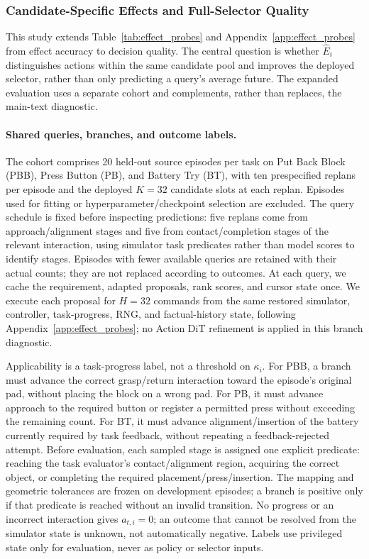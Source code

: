 \begingroup
\raggedbottom

\subsubsection{Candidate-Specific Effects and Full-Selector Quality}
\label{app:rebuttal_selector}

This study extends Table~\ref{tab:effect_probes} and Appendix~\ref{app:effect_probes} from effect accuracy to decision quality.
The central question is whether $\widehat E_i$ distinguishes actions within the same candidate pool and improves the deployed selector, rather than only predicting a query's average future.
The expanded evaluation uses a separate cohort and complements, rather than replaces, the main-text diagnostic.

\paragraph{Shared queries, branches, and outcome labels.}
The cohort comprises 20 held-out source episodes per task on Put Back Block (PBB), Press Button (PB), and Battery Try (BT), with ten prespecified replans per episode and the deployed $K=32$ candidate slots at each replan.
Episodes used for fitting or hyperparameter/checkpoint selection are excluded.
The query schedule is fixed before inspecting predictions: five replans come from approach/alignment stages and five from contact/completion stages of the relevant interaction, using simulator task predicates rather than model scores to identify stages.
Episodes with fewer available queries are retained with their actual counts; they are not replaced according to outcomes.
At each query, we cache the requirement, adapted proposals, rank scores, and cursor state once.
We execute each proposal for $H=32$ commands from the same restored simulator, controller, task-progress, RNG, and factual-history state, following Appendix~\ref{app:effect_probes}; no Action DiT refinement is applied in this branch diagnostic.

Applicability is a task-progress label, not a threshold on $\kappa_i$.
For PBB, a branch must advance the correct grasp/return interaction toward the episode's original pad, without placing the block on a wrong pad.
For PB, it must advance approach to the required button or register a permitted press without exceeding the remaining count.
For BT, it must advance alignment/insertion of the battery currently required by task feedback, without repeating a feedback-rejected attempt.
Before evaluation, each sampled stage is assigned one explicit predicate: reaching the task evaluator's contact/alignment region, acquiring the correct object, or completing the required placement/press/insertion.
The mapping and geometric tolerances are frozen on development episodes; a branch is positive only if that predicate is reached without an invalid transition.
No progress or an incorrect interaction gives $a_{t,i}=0$; an outcome that cannot be resolved from the simulator state is unknown, not automatically negative.
Labels use privileged state only for evaluation, never as policy or selector inputs.

